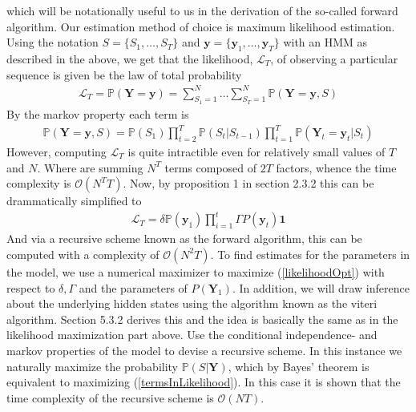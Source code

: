 which will be notationally useful to us in the derivation of the so-called forward algorithm. Our estimation method of choice is maximum likelihood estimation. Using the notation $S = \{S_1,\dots, S_T\}$ and $\mathbf{y} = \{\mathbf{y}_1,\dots, \mathbf{y}_T\}$ with an HMM as described in the above, we get that the likelihood, $\mathcal{L}_T$, of observing a particular sequence is given be the law of total probability
\begin{align}
    \mathcal{L}_T = \mathbb{P}(\mathbf{Y} = \mathbf{y}) = \sum_{S_1 = 1}^N\dots \sum_{S_T = 1}^N \mathbb{P}(\mathbf{Y} = \mathbf{y}, S)
\end{align}
By the markov property each term is
\begin{align}
    \mathbb{P}(\mathbf{Y} = \mathbf{y}, S) = \mathbb{P}(S_1)\prod_{t = 2}^T \mathbb{P}(S_t | S_{t-1})\prod_{t = 1}^T \mathbb{P}(\mathbf{Y}_t = \mathbf{y}_t | S_t) 
    \label{termsInLikelihood}
\end{align}
However, computing $\mathcal{L}_T$ is quite intractible even for relatively small values of $T$ and $N$. Where are summing $N^T$ terms composed of $2T$ factors, whence the time complexity is $\mathcal{O}\left(N^TT\right)$. Now, by proposition 1 in section 2.3.2 \cite{HHMForTimesSeries} this can be drammatically simplified to
\begin{align}
    \mathcal{L}_T = \delta\mathbb{P}(\mathbf{y}_1)\prod_{i = 1}^{t}\Gamma P(\mathbf{y}_t)\mathbf{1}
    \label{likelihoodOpt}
\end{align}
And via a recursive scheme known as the forward algorithm, this can be computed with a complexity of $\mathcal{O}(N^2T)$. To find estimates for the parameters in the model, we use a numerical maximizer to maximize (\ref{likelihoodOpt}) with respect to $\delta, \Gamma$ and the parameters of $P(\mathbf{Y}_1)$. In addition, we will draw inference about the underlying hidden states using the algorithm known as the viteri algorithm. Section 5.3.2 \cite{HHMForTimesSeries}  derives this and the idea is basically the same as in the likelihood maximization part above. Use the conditional independence- and markov properties of the model to devise a recursive scheme. In this instance we naturally maximize the probability $\mathbb{P}(S | \mathbf{Y})$, which by Bayes' theorem is equivalent to maximizing (\ref{termsInLikelihood}). In this case it is shown that the time complexity of the recursive scheme is $\mathcal{O}(NT)$.

